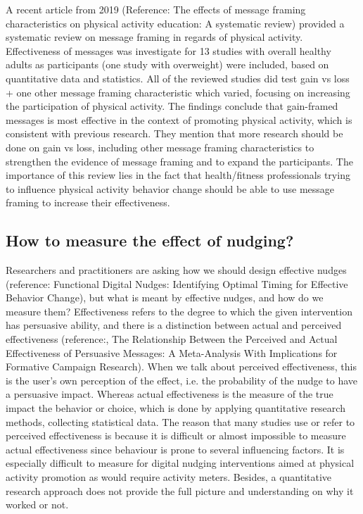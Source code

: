 A recent article from 2019 (Reference: The effects of message framing characteristics on physical activity education: A systematic review) provided a systematic review on message framing in regards of physical activity. Effectiveness of messages was investigate for 13 studies with overall healthy adults as participants (one study with overweight) were included, based on quantitative data and statistics. All of the reviewed studies did test gain vs loss + one other message framing characteristic which varied, focusing on increasing the participation of physical activity. The findings conclude that gain-framed messages is most effective in the context of promoting physical activity, which is consistent with previous research. They mention that more research should be done on gain vs loss, including other message framing characteristics to strengthen the evidence of message framing and to expand the participants.
The importance of this review lies in the fact that health/fitness professionals trying to influence physical activity behavior change should be able to use message framing to increase their effectiveness.

\subsection{How to measure the effect of nudging?}
Researchers and practitioners are asking how we should design effective nudges (reference: Functional Digital Nudges: Identifying Optimal Timing for Effective Behavior Change), but what is meant by effective nudges, and how do we measure them? Effectiveness refers to the degree to which the given intervention has persuasive ability, and there is a distinction between actual and perceived effectiveness (reference:, The Relationship Between the Perceived and Actual Effectiveness of Persuasive Messages: A Meta-Analysis With Implications for Formative Campaign Research). When we talk about perceived effectiveness, this is the user's own perception of the effect, i.e. the probability of the nudge to have a persuasive impact. Whereas actual effectiveness is the measure of the true impact the behavior or choice, which is done by applying quantitative research methods, collecting statistical data. The reason that many studies use or refer to perceived effectiveness is because it is difficult or almost impossible to measure actual effectiveness since behaviour is prone to several influencing factors. It is especially difficult to measure for digital nudging interventions aimed at physical activity promotion as would require activity meters. Besides, a quantitative research approach does not provide the full picture and understanding on why it worked or not. 
